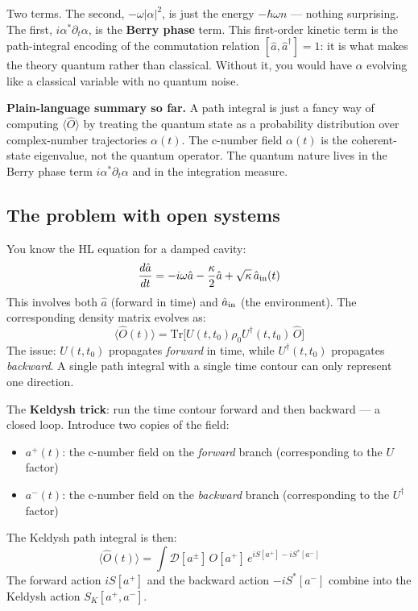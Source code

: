 \documentclass[12pt]{article}
\begin{document}
Two terms.  The second, $-\omega|\alpha|^2$, is just the energy $-\hbar\omega n$
--- nothing surprising.  The first, $i\alpha^*\partial_t\alpha$, is the
\textbf{Berry phase} term.  This first-order kinetic term is the
path-integral encoding of the commutation relation
$[\hat{a},\hat{a}^\dagger]=1$: it is what makes the theory quantum
rather than classical.  Without it, you would have $\alpha$ evolving
like a classical variable with no quantum noise.

\begin{remark}
\textbf{Plain-language summary so far.}
A path integral is just a fancy way of computing $\langle\hat{O}\rangle$
by treating the quantum state as a probability distribution over
complex-number trajectories $\alpha(t)$.  The c-number field $\alpha(t)$
is the coherent-state eigenvalue, not the quantum operator.  The quantum
nature lives in the Berry phase term $i\alpha^*\partial_t\alpha$ and in
the integration measure.
\end{remark}

\subsection{The problem with open systems}

You know the HL equation for a damped cavity:
\begin{equation}
  \frac{d\hat{a}}{dt} = -i\omega\hat{a} - \frac{\kappa}{2}\hat{a}
  + \sqrt{\kappa}\,\hat{a}_{\rm in}(t)
  \label{eq:HL_recall}
\end{equation}
This involves both $\hat{a}$ (forward in time) and $\hat{a}_{\rm in}$
(the environment).  The corresponding density matrix evolves as:
\begin{equation}
  \langle\hat{O}(t)\rangle =
  \mathrm{Tr}\bigl[U(t,t_0)\rho_0 U^\dagger(t,t_0)\,\hat{O}\bigr]
  \label{eq:open_expect}
\end{equation}
The issue: $U(t,t_0)$ propagates \emph{forward} in time, while
$U^\dagger(t,t_0)$ propagates \emph{backward}.  A single path integral
with a single time contour can only represent one direction.

The \textbf{Keldysh trick}: run the time contour forward and then
backward --- a closed loop.  Introduce two copies of the field:
\begin{itemize}
  \item $a^+(t)$: the c-number field on the \emph{forward} branch
    (corresponding to the $U$ factor)
  \item $a^-(t)$: the c-number field on the \emph{backward} branch
    (corresponding to the $U^\dagger$ factor)
\end{itemize}
The Keldysh path integral is then:
\begin{equation}
  \langle\hat{O}(t)\rangle =
  \int\mathcal{D}[a^\pm]\,
  O[a^+]\,
  e^{iS[a^+] - iS^*[a^-]}
  \label{eq:Keldysh_PI}
\end{equation}
The forward action $iS[a^+]$ and the backward action $-iS^*[a^-]$
combine into the Keldysh action $S_K[a^+, a^-]$.
\end{document}
